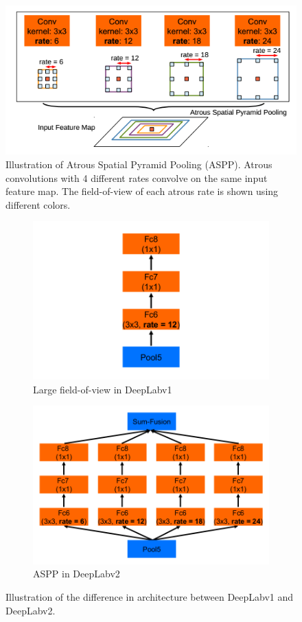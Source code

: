 	\begin{figure}
		\centering
		\includegraphics[width=0.6\linewidth]{images/aspp}
		\caption{Illustration of Atrous Spatial Pyramid Pooling (ASPP). Atrous convolutions with 4 different rates convolve on the same input feature map. The field-of-view of each atrous rate is shown using different colors.}
		\label{Fig:aspp}
	\end{figure}
	
	\begin{figure}
		\begin{subfigure}{.5\textwidth}
			\centering
			\includegraphics[width=1.03\linewidth]{images/v1_largeFOV}
			\caption{Large field-of-view in DeepLabv1}
		\end{subfigure}
		\begin{subfigure}{.5\textwidth}
			\centering
			\includegraphics[width=1\linewidth]{images/v2_aspp}
			\caption{ASPP in DeepLabv2}
		\end{subfigure}
		\caption{Illustration of the difference in architecture between DeepLabv1 and DeepLabv2.}
		\label{Fig:v1vsv2}
	\end{figure}
	
